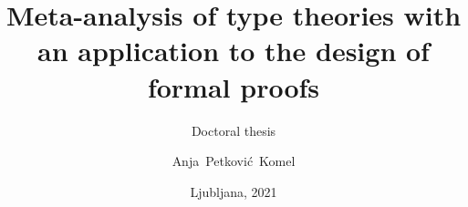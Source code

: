 \documentclass[
  fontsize=10pt,
  twoside=false
]{kaobook}
\begin{document}
\makeatletter
\def\pgfsys@hboxsynced#1{%
  {%
    \pgfsys@beginscope%
    \setbox\pgf@hbox=\hbox{%
      \hskip\pgf@pt@x%
      \raise\pgf@pt@y\hbox{%
        \pgf@pt@x=0pt%
        \pgf@pt@y=0pt%
        \special{pdf: content q}%
        \pgflowlevelsynccm%
        \pgfsys@invoke{q -1 0 0 -1 0 0 cm}%
        \special{pdf: content -1 0 0 -1 0 0 cm q}%
        \pgfsys@invoke{0 J [] 0 d}%
        \wd#1=0pt%
        \ht#1=0pt%
        \dp#1=0pt%
        \box#1%
        \pgfsys@invoke{n Q Q Q}%
      }%
      \hss%
    }%
    \wd\pgf@hbox=0pt%
    \ht\pgf@hbox=0pt%
    \dp\pgf@hbox=0pt%
    \pgfsys@hbox\pgf@hbox%
    \pgfsys@endscope%
  }%
}
\makeatother

\setmainfont[
	Ligatures=TeX,
	ItalicFont = Fira Sans Light Italic,
	BoldFont = Fira Sans,
	BoldItalicFont = Fira Sans Italic
]{Fira Sans Light}
\setmonofont[Ligatures=TeX]{Fira Mono}


\newcommand{\programmesl}{Matematika} %
\newcommand{\programmeen}{Mathematics} %
\newcommand{\authorname}{Anja~Petković~Komel} %
\newcommand{\mentor}{prof.~dr.~Andrej Bauer}  %

\newcommand{\slovenetitle}{Meta-analiza teorij tipov z uporabo v oblikovanju formalnih dokazov}
\newcommand{\englishtitle}{Meta-analysis of type theories with an application to the design of formal proofs}
\newcommand{\graduationyear}{2021} %


\title{\englishtitle}
\subtitle{Doctoral thesis}

\author{\authorname}

\date{Ljubljana, \graduationyear}

\publishers{Adviser: \mentor}



\frontmatter %
\end{document}
